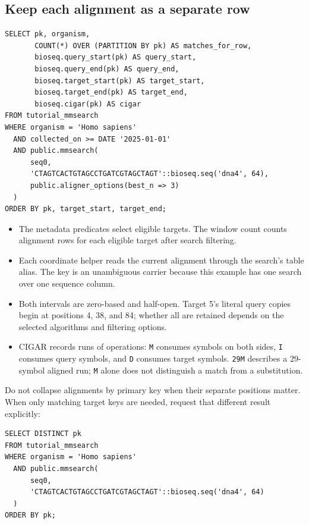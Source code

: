 \subsection{Keep each alignment as a separate row}

\par\noindent\begin{minipage}{\linewidth}
\begin{lstlisting}[style=bioseq-appendix-sql]
SELECT pk, organism,
       COUNT(*) OVER (PARTITION BY pk) AS matches_for_row,
       bioseq.query_start(pk) AS query_start,
       bioseq.query_end(pk) AS query_end,
       bioseq.target_start(pk) AS target_start,
       bioseq.target_end(pk) AS target_end,
       bioseq.cigar(pk) AS cigar
FROM tutorial_mmsearch
WHERE organism = 'Homo sapiens'
  AND collected_on >= DATE '2025-01-01'
  AND public.mmsearch(
      seq0,
      'CTAGTCACTGTAGCCTGATCGTAGCTAGT'::bioseq.seq('dna4', 64),
      public.aligner_options(best_n => 3)
  )
ORDER BY pk, target_start, target_end;
\end{lstlisting}
\end{minipage}

\begin{itemize}
  \item The metadata predicates select eligible targets. The window count
    counts alignment rows for each eligible target after search filtering.
  \item Each coordinate helper reads the current alignment through the
    search's table alias. The key is an unambiguous carrier because this
    example has one search over one sequence column.
  \item Both intervals are zero-based and half-open. Target 5's literal
    query copies begin at positions 4, 38, and 84; whether all are retained
    depends on the selected algorithms and filtering options.
  \item CIGAR records runs of operations: \texttt{M} consumes symbols on
    both sides, \texttt{I} consumes query symbols, and \texttt{D} consumes
    target symbols. \texttt{29M} describes a 29-symbol aligned run;
    \texttt{M} alone does not distinguish a match from a substitution.
\end{itemize}

Do not collapse alignments by primary key when their separate positions
matter. When only matching target keys are needed, request that different
result explicitly:

\par\noindent\begin{minipage}{\linewidth}
\begin{lstlisting}[style=bioseq-appendix-sql]
SELECT DISTINCT pk
FROM tutorial_mmsearch
WHERE organism = 'Homo sapiens'
  AND public.mmsearch(
      seq0,
      'CTAGTCACTGTAGCCTGATCGTAGCTAGT'::bioseq.seq('dna4', 64)
  )
ORDER BY pk;
\end{lstlisting}
\end{minipage}

